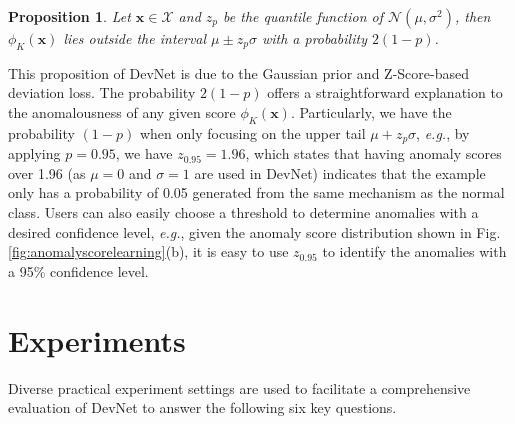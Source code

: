 \documentclass[10pt,journal,compsoc]{IEEEtran}
\newtheorem{prop}{Proposition}
\begin{document}
\begin{prop}
Let $\mathbf{x} \in \mathcal{X}$ and $z_{p}$ be the quantile function of $\mathcal{N}(\mu, \sigma^{2})$, then $\phi_K(\mathbf{x})$ lies outside the interval $\mu \pm z_{p}\sigma $ with a probability $2(1-p)$.
\end{prop}

This proposition of DevNet is due to the Gaussian prior and Z-Score-based deviation loss. The probability $2(1-p)$ offers a straightforward explanation to the anomalousness of any given score $\phi_K(\mathbf{x})$. Particularly, we have the probability $(1-p)$ when only focusing on the upper tail $\mu + z_{p}\sigma $, \textit{e.g.}, by applying $p=0.95$, we have $z_{0.95}=1.96$, which states that having anomaly scores over 1.96 (as $\mu=0$ and $ \sigma=1 $ are used in DevNet) indicates that the example only has a probability of 0.05 generated from the same mechanism as the normal class. Users can also easily choose a threshold to determine anomalies with a desired confidence level, \textit{e.g.}, given the anomaly score distribution shown in Fig. \ref{fig:anomalyscorelearning}(b), it is easy to use $z_{0.95}$ to identify the anomalies with a 95\% confidence level.

\section{Experiments}


Diverse practical experiment settings are used to facilitate a comprehensive evaluation of DevNet to answer the following six key questions.
\end{document}
